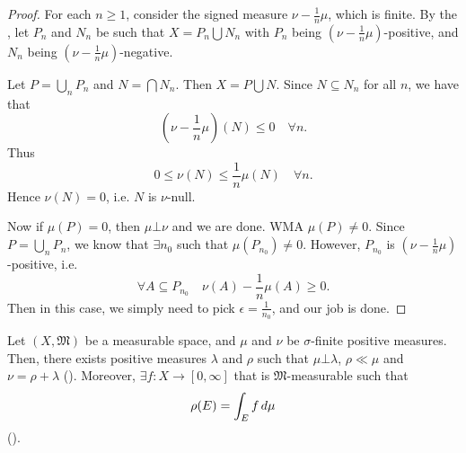 \documentclass[notoc,notitlepage]{tufte-book}
\begin{document}
\begin{proof}
  For each $n \geq 1$, consider the signed measure $\nu - \frac{1}{n} \mu$,
  which is finite.
  By the ,
  let $P_n$ and $N_n$ be such that
  $X = P_n \bigcup N_n$ with
  $P_n$ being $\left( \nu - \frac{1}{n}\mu \right)$-positive, and
  $N_n$ being $\left( \nu - \frac{1}{n}\mu \right)$-negative.

  Let $P = \bigcup_n P_n$ and $N = \bigcap N_n$. Then $X = P \bigcup N$.
  Since $N \subseteq N_n$ for all $n$, we have that
  \begin{equation*}
    \left( \nu - \frac{1}{n} \mu \right)(N) \leq 0 \quad \forall n.
  \end{equation*}
  Thus
  \begin{equation*}
    0 \leq \nu(N) \leq \frac{1}{n} \mu(N) \quad \forall n.
  \end{equation*}
  Hence $\nu(N) = 0$, i.e. $N$ is $\nu$-null.

  Now if $\mu(P) = 0$, then $\mu \bot \nu$ and we are done.
  WMA $\mu(P) \neq 0$. Since $P = \bigcup_n P_n$, we know that $\exists n_0$
  such that $\mu(P_{n_0}) \neq 0$.
  However, $P_{n_0}$ is $\left( \nu - \frac{1}{n} \mu \right)$-positive,
  i.e.
  \begin{equation*}
    \forall A \subseteq P_{n_0} \quad \nu(A) - \frac{1}{n} \mu(A) \geq 0.
  \end{equation*}
  Then in this case, we simply need to pick $\epsilon = \frac{1}{n_0}$,
  and our job is done.
\end{proof}

\begin{thm}\label{thm:lebesgue_decomposition_theorem}\label{thm:radon_nikodym_theorem}
  Let $(X, \mathfrak{M})$ be a measurable space,
  and $\mu$ and $\nu$ be $\sigma$-finite positive measures.
  Then, there exists positive measures $\lambda$ and $\rho$
  such that $\mu \bot \lambda$, $\rho \ll \mu$ and $\nu = \rho + \lambda$
  ().
  Moreover, $\exists f : X \to [0, \infty]$ that is $\mathfrak{M}$-measurable such that
  \begin{equation*}
    \rho(E) = \int_{E} f \mathop{}\!d{\mu}
  \end{equation*}
  ().
\end{thm}

\end{document}
